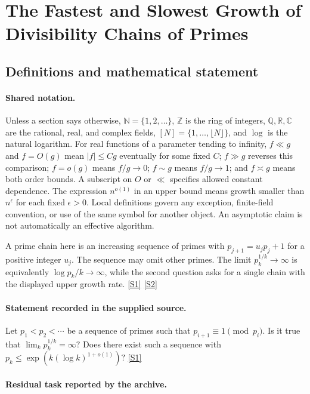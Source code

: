\documentclass[11pt,a4paper]{article}
\newcommand{\N}{\mathbb{N}}
\newcommand{\Z}{\mathbb{Z}}
\newcommand{\Q}{\mathbb{Q}}
\newcommand{\R}{\mathbb{R}}
\newcommand{\C}{\mathbb{C}}
\newcommand{\sref}[2]{\hyperlink{source:#1:#2}{[S#2]}}
\begin{document}
\section{The Fastest and Slowest Growth of Divisibility Chains of Primes}\label{statement}


\subsection{Definitions and mathematical statement}

\paragraph{Shared notation.}Unless a section says otherwise, $\N=\{1,2,\ldots\}$,
$\Z$ is the ring of integers, $\Q,\R,\C$ are the rational, real, and complex
fields, $[N]=\{1,\ldots,\lfloor N\rfloor\}$, and $\log$ is the natural
logarithm. For real functions of a parameter tending to infinity,
$f\ll g$ and $f=O(g)$ mean $|f|\leq Cg$ eventually for some fixed $C$;
$f\gg g$ reverses this comparison; $f=o(g)$ means $f/g\to0$;
$f\sim g$ means $f/g\to1$; and $f\asymp g$ means both order bounds.
A subscript on $O$ or $\ll$ specifies allowed constant dependence.
The expression $n^{o(1)}$ in an upper bound means growth smaller than
$n^\epsilon$ for each fixed $\epsilon>0$. Local definitions govern any
exception, finite-field convention, or use of the same symbol for another
object. An asymptotic claim is not automatically an effective algorithm.



A prime chain here is an increasing sequence of primes with $p_{j+1}=u_jp_j+1$ for a positive integer $u_j$. The sequence may omit other primes. The limit $p_k^{1/k}\to\infty$ is equivalently $\log p_k/k\to\infty$, while the second question asks for a single chain with the displayed upper growth rate. \sref{statement}{1} \sref{statement}{2}

\paragraph{Statement recorded in the supplied source.}
Let $p_1<p_2<\cdots$ be a sequence of primes such that $p_{i+1}\equiv 1\pmod{p_i}$. Is it true that $ \lim_k p_k^{1/k}=\infty? $ Does there exist such a sequence with $ p_k \leq \exp(k(\log k)^{1+o(1)})? $ \sref{statement}{1}

\paragraph{Residual task reported by the archive.}
\end{document}
